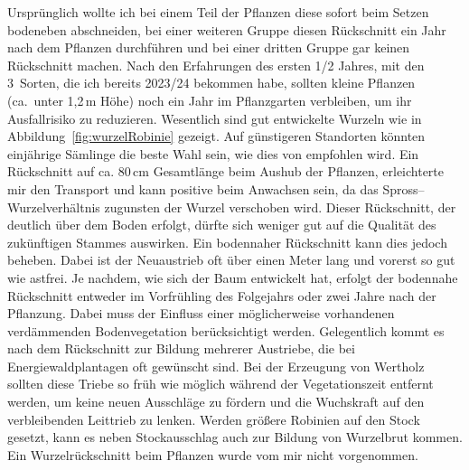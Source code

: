 \documentclass[twocolumn]{scrartcl}
\begin{document}
Ursprünglich wollte ich bei einem Teil der Pflanzen diese sofort beim
Setzen bodeneben abschneiden, bei einer weiteren Gruppe diesen
Rückschnitt ein Jahr nach dem Pflanzen durchführen und bei einer
dritten Gruppe gar keinen Rückschnitt machen. Nach den Erfahrungen des
ersten 1/2 Jahres, mit den 3~Sorten, die ich bereits 2023/24 bekommen
habe, sollten kleine Pflanzen (ca.\ unter 1,2\,m Höhe) noch ein Jahr
im Pflanzgarten verbleiben, um ihr Ausfallrisiko zu
reduzieren. Wesentlich sind gut entwickelte Wurzeln wie in
Abbildung~\ref{fig:wurzelRobinie} gezeigt. Auf günstigeren Standorten
könnten einjährige Sämlinge die beste Wahl sein, wie dies von
\citet{ciuvat2022robinieRumaenien} empfohlen wird. Ein Rückschnitt auf
ca. 80\,cm Gesamtlänge beim Aushub der Pflanzen, erleichterte mir den
Transport und kann positive beim Anwachsen sein, da das
Spross--Wurzelverhältnis zugunsten der Wurzel verschoben wird.  Dieser
Rückschnitt, der deutlich über dem Boden erfolgt, dürfte sich weniger
gut auf die Qualität des zukünftigen Stammes auswirken.  Ein
bodennaher Rückschnitt kann dies jedoch beheben. Dabei ist der
Neuaustrieb oft über einen Meter lang und vorerst so gut wie astfrei.
Je nachdem, wie sich der Baum entwickelt hat, erfolgt der bodennahe
Rückschnitt entweder im Vorfrühling des Folgejahrs oder zwei Jahre
nach der Pflanzung. Dabei muss der Einfluss einer möglicherweise
vorhandenen verdämmenden Bodenvegetation berücksichtigt
werden. Gelegentlich kommt es nach dem Rückschnitt zur Bildung
mehrerer Austriebe, die bei Energiewaldplantagen oft gewünscht sind.
Bei der Erzeugung von Wertholz sollten diese Triebe so früh wie
möglich während der Vegetationszeit entfernt werden, um keine neuen
Ausschläge zu fördern und die Wuchskraft auf den verbleibenden
Leittrieb zu lenken.  Werden größere Robinien auf den Stock gesetzt,
kann es neben Stockausschlag auch zur Bildung von Wurzelbrut
kommen. Ein Wurzelrückschnitt beim Pflanzen wurde vom mir nicht
vorgenommen.
\end{document}
